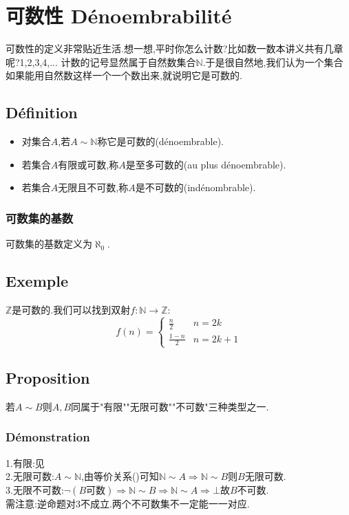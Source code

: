 \documentclass[12pt, a4paper, oneside]{ctexbook}
\begin{document}
\section{可数性 Dénoembrabilité}
  可数性的定义非常贴近生活.想一想,平时你怎么计数?比如数一数本讲义共有几章呢?1,2,3,4,...
  计数的记号显然属于自然数集合$\mathbb{N}$.于是很自然地,我们认为一个集合如果能用自然数这样一个一个数出来,就说明它是可数的.
  \subsection{Définition}
  \noindent 
  \begin{itemize}
    \item 对集合$A$,若$A\sim\mathbb{N} $称它是可数的(dénoembrable).
    \item 若集合$A$有限或可数,称$A$是至多可数的(au plus dénoembrable).
    \item 若集合$A$无限且不可数,称$A$是不可数的(indénombrable).
\end{itemize}
  \subsubsection{可数集的基数}
  可数集的基数定义为$\aleph_0$.
  \subsection{Exemple}\label{myref:Zkeshu}
  $\mathbb{Z}$是可数的.我们可以找到双射$f:\mathbb{N}\rightarrow\mathbb{Z}$:
  $$
    f(n)=\begin{cases}
    \frac{n}{2} &n=2k\\
    \frac{1-n}{2} &n=2k+1
    \end{cases}
  $$
  \subsection{Proposition}
  若$A\sim B$则$A,B$同属于"有限""无限可数""不可数"三种类型之一.
  \subsubsection{Démonstration}
  \noindent
  1.有限:见 \\
  2.无限可数:$A\sim \mathbb{N}$,由等价关系()可知$\mathbb{N}\sim A\Rightarrow\mathbb{N}\sim B$则$B$无限可数.\\
  3.无限不可数:$\lnot(B\text{可数})\Rightarrow\mathbb{N}\sim B\Rightarrow\mathbb{N}\sim A\Rightarrow\bot$故$B$不可数.\\
  需注意:逆命题对3不成立.两个不可数集不一定能一一对应.
\end{document}
